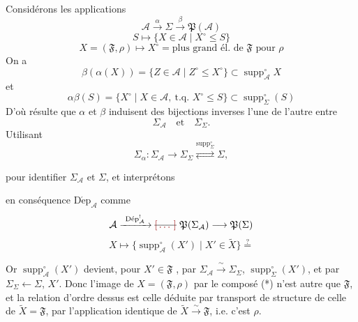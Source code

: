\documentclass[11pt,a4paper]{article}
\begin{document}
 Considérons les applications
\[
  \mathcal{A} \xrightarrow{\ \alpha\ } \Sigma
  \xrightarrow{\ \beta\ } \mathfrak{P}(\mathcal{A})
\]
\[
  S \longmapsto \{ X \in \mathcal{A} \mid X^{\circ} \leq S \}
\]
\[
  X = (\mathfrak{F}, \rho) \longmapsto X^{\circ} =
  \text{plus grand él. de } \mathfrak{F} \text{ pour } \rho
\]
On a
\[
  \beta(\alpha(X)) = \{ Z \in \mathcal{A} \mid Z^{\circ} \leq X^{\circ} \}
  \subset \operatorname{supp}^{\circ}_{\mathcal{A}} X
\]
 et
\[
  \alpha\beta(S) = \{ X^{\circ} \mid X \in \mathcal{A},\ \text{t.q. }
  X^{\circ} \leq S \} \subset \operatorname{supp}^{\circ}_{\Sigma}(S)
\]
D'où résulte que $\alpha$ et $\beta$ induisent des bijections inverses l'une
de l'autre entre
\[
  \Sigma_{\mathcal{A}} \quad \text{et} \quad \Sigma_{\Sigma} .
\]
Utilisant
\[
  \Sigma_{\alpha} : \Sigma_{\mathcal{A}} \longrightarrow \Sigma_{\Sigma}
  \overset{\operatorname{supp}^{\circ}_{\Sigma}}{\rightleftarrows} \Sigma ,
\]

 pour identifier $\Sigma_{\mathcal{A}}$ et
$\Sigma$, et interprétons



en conséquence $\operatorname{D\acute{e}p}_{\mathcal{A}}$ comme
\[
  \mathcal{A} \xrightarrow{\ \operatorname{D\acute{e}p}^{!}_{\mathcal{A}}\ }
  \text{\struck{\ill{}}}\ \mathfrak{P}(\Sigma_{\mathcal{A}})
  \longrightarrow \mathfrak{P}(\Sigma)
\]
\[
  X \longmapsto \{ \operatorname{supp}^{\circ}_{\mathcal{A}}(X') \mid
  X' \in \widetilde{X} \} \overset{?}{=}
\]


Or $\operatorname{supp}^{\circ}_{\mathcal{A}}(X')$
 devient, pour $X' \in \mathfrak{F}$
, par
$\Sigma_{\mathcal{A}} \xrightarrow{\ \sim\ } \Sigma_{\Sigma}$,
$\operatorname{supp}^{\circ}_{\Sigma}(X')$, et par
$\Sigma_{\Sigma} \longleftarrow \Sigma$, $X'$. Donc l'image de
$X = (\mathfrak{F}, \rho)$  par le composé (*) n'est autre que $\mathfrak{F}$, et la relation d'ordre  dessus est celle déduite par transport de structure de
celle de $\widetilde{X} = \mathfrak{F}$, par l'application identique de
$\widetilde{X} \xrightarrow{\ \sim\ } \mathfrak{F}$, i.e. c'est $\rho$.
\end{document}

